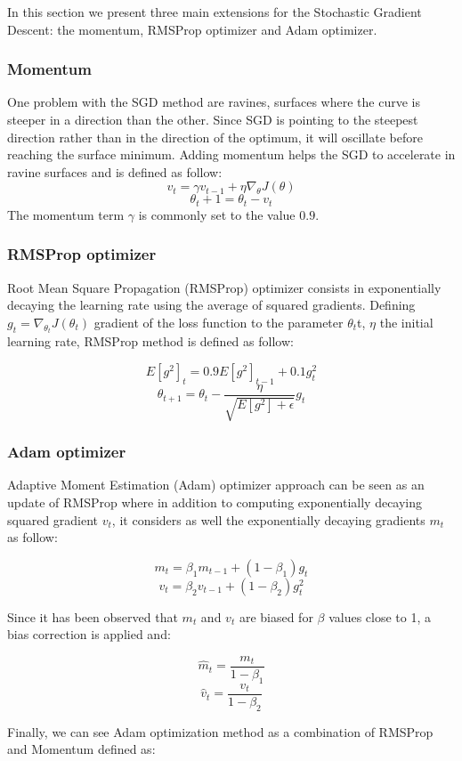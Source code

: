 \documentclass[master, tikz, final,11pt, dvipdfmx]{iscs-thesis}
\begin{document}
In this section we present three main extensions for the Stochastic Gradient Descent: the momentum, RMSProp optimizer and Adam optimizer.
\subsubsection{Momentum}

One problem with the SGD method are ravines, surfaces where the curve is steeper in a direction than the other. Since SGD is pointing to the steepest direction rather than in the direction of the optimum, it will oscillate before reaching the surface minimum. Adding momentum helps the SGD to accelerate in ravine surfaces and is defined as follow:
\[v_t = \gamma v_{t-1} + \eta \nabla_\theta J(\theta)\]
\[\theta_t+1 = \theta_t - v_t\]
The momentum term $\gamma$ is commonly set to the value $0.9$.
\subsubsection{RMSProp optimizer}
\label{RMS}
Root Mean Square Propagation (RMSProp) optimizer \cite{hinton2012neural} consists in exponentially decaying the learning rate using the average of squared gradients.
Defining $g_t = \nabla_{\theta_t}J(\theta_t)$ gradient of the loss function to the parameter $\theta_t$t, $\eta$ the initial learning rate, RMSProp method is defined as follow:

\[E[g^2]_t = 0.9E[g^2]_{t-1} +0.1g^2_t\]
\[\theta_{t+1} = \theta_t - \frac{\eta}{\sqrt{E[g^2]+\epsilon}} g_t\]

\subsubsection{Adam optimizer}


Adaptive Moment Estimation (Adam) optimizer \cite{ADAM} approach can be seen as an update of RMSProp where in addition to computing exponentially decaying squared gradient $v_t$, it considers as well the exponentially decaying gradients $m_t$ as follow:

\[m_t = \beta_1 m_{t-1} + (1-\beta_1)g_t\]
\[v_t = \beta_2 v_{t-1} + (1-\beta_2)g_t^2\]

Since it has been observed that $m_t$ and $v_t$ are biased for $\beta$ values close to 1, a bias correction is applied and:

\[\hat m_t = \frac{m_t}{1-\beta_1}\]
\[\hat v_t = \frac{v_t}{1-\beta_2}\]

Finally, we can see Adam optimization method as a combination of RMSProp and Momentum defined as:
\end{document}
